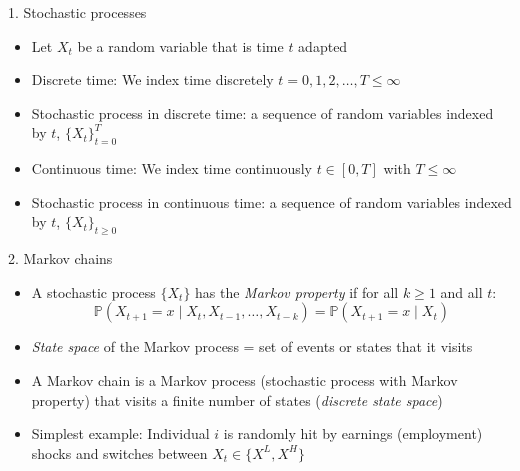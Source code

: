 \documentclass[10pt]{beamer}
\begin{document}
\begin{frame}{1. Stochastic processes}
\begin{itemize}
\item Let $X_t$ be a random variable that is time $t$ adapted

\item Discrete time: We index time discretely $t = 0, 1, 2, \ldots, T \leq \infty$

\item Stochastic process in discrete time: a sequence of random variables indexed by $t$, $\{X_t\}_{t=0}^T$

\item Continuous time: We index time continuously $t \in [0, T]$ with $T \leq \infty$

\item Stochastic process in continuous time: a sequence of random variables indexed by $t$, $\{X_t\}_{t \geq 0}$

\end{itemize}
\end{frame}



\begin{frame}{2. Markov chains}
\begin{itemize}
\item A stochastic process $\{X_t\}$ has the \textit{Markov property} if for all $k \geq 1$ and all $t$:
\begin{equation*}
	\mathbb P(X_{t+1} = x \mid X_t, X_{t-1}, \ldots, X_{t-k}) = \mathbb P(X_{t+1} = x \mid X_t)
\end{equation*}

\item \textit{State space} of the Markov process = set of events or states that it visits 

\item A Markov chain is a Markov process (stochastic process with Markov property) that visits a finite number of states (\textit{discrete state space})

\item Simplest example: Individual $i$ is randomly hit by earnings (employment) shocks and switches between $X_t \in \{X^L, X^H\}$
\end{itemize}
\end{frame}
\end{document}
